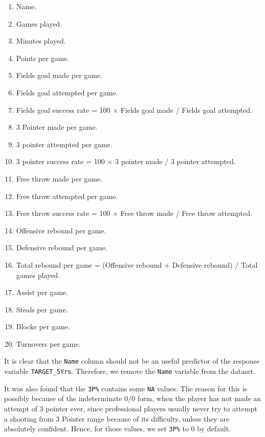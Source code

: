 \documentclass[10pt]{article}
\begin{document}
\begin{enumerate}
\setlength\itemsep{-5pt}
\item Name.
\item Games played.
\item
  Minutes played.
\item
  Points per game.
\item
  Fields goal made per game.
\item
  Fields goal attempted per game.
\item
  Fields goal success rate = 100 \(\times\) Fields goal made / Fields
  goal attempted.
\item
  3 Pointer made per game.
\item
  3 pointer attempted per game.
\item
  3 pointer success rate = 100 \(\times\) 3 pointer made / 3 pointer
  attempted.
\item
  Free throw made per game.
\item
  Free throw attempted per game.
\item
  Free throw success rate = 100 \(\times\) Free throw made / Free throw
  attempted.
\item
  Offensive rebound per game.
\item
  Defensive rebound per game.
\item
  Total rebound per game = (Offensive rebound + Defensive rebound) /
  Total games played.
\item
  Assist per game.
\item
  Steals per game.
\item
  Blocks per game.
\item
  Turnovers per game.
\end{enumerate}

It is clear that the \texttt{Name} column should not be an useful
predictor of the response variable \texttt{TARGET\_5Yrs}. Therefore, we
remove the \texttt{Name} variable from the dataset. \par 

It was also found that the \texttt{3P\%} contains some \texttt{NA} values. The reason for this is possibly because of the indeterminate \(0/0\) form, when the player has not made an attempt of 3 pointer ever, since professional players usually never try to attempt a shooting from 3 Pointer range because of its difficulty, unless they are absolutely confident. Hence, for those values, we set \texttt{3P\%} to \(0\) by default.
\end{document}
